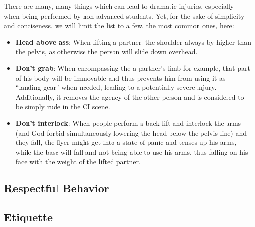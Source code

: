 There are many, many things which can lead to dramatic injuries, especially when being performed by non-advanced students.
Yet, for the sake of simplicity and conciseness, we will limit the list to a few, the most common ones, here:

\begin{itemize}
    \item \textbf{Head above ass}: When lifting a partner, the shoulder always by higher than the pelvis, as otherwise the person will slide down overhead.
    \item \textbf{Don't grab}: When encompassing the a partner's limb for example, that part of his body will be immovable and thus prevents him from using it as ``landing gear'' when needed, leading to a potentially severe injury.
    Additionally, it removes the agency of the other person and is considered to be simply rude in the CI scene.
    \item \textbf{Don't interlock}: When people perform a back lift and interlock the arms (and God forbid simultaneously lowering the head below the pelvis line) and they fall, the flyer might get into a state of panic and tenses up his arms, while the base will fall and not being able to use his arms, thus falling on his face with the weight of the lifted partner.
\end{itemize}

\subsection{Respectful Behavior}\label{subsec:respectful-behavior}



\subsection{Etiquette}\label{subsec:etiquette}



